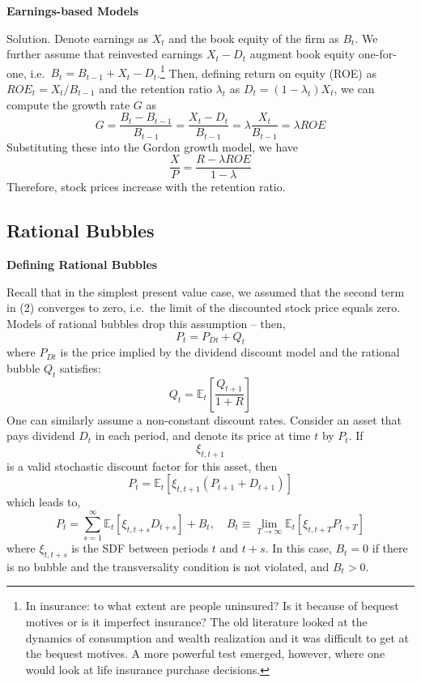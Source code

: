 \documentclass[
]{book}
\begin{document}
\textbf{Earnings-based Models}

Solution. Denote earnings as \(X_{t}\) and the book equity of the firm as \(B_{t}\). We further assume that reinvested earnings \(X_{t}-D_{t}\) augment book equity one-for-one, i.e.~\(B_{t}=B_{t-1}+X_{t}-D_{t}\).\footnote{In insurance: to what extent are people uninsured? Is it because of bequest motives or is it imperfect insurance? The old literature looked at the dynamics of consumption and wealth realization and it was difficult to get at the bequest motives. A more powerful test emerged, however, where one would look at life insurance purchase decisions.} Then, defining return on equity (ROE) as \(ROE_{t}=X_{t}/B_{t-1}\) and the retention ratio \(\lambda_t\) as \(D_{t}=\left(1-\lambda_{t}\right)X_{t}\), we can compute the growth rate \(G\) as
\[
G=\frac{B_{t}-B_{t-1}}{B_{t-1}}=\frac{X_{t}-D_{t}}{B_{t-1}}=\lambda\frac{X_{t}}{B_{t-1}}=\lambda ROE
\]
Substituting these into the Gordon growth model, we have
\[
\frac{X}{P}=\frac{R-\lambda ROE}{1-\lambda}
\]
Therefore, stock prices increase with the retention ratio.

\hypertarget{rational-bubbles}{%
\subsection{\texorpdfstring{\textbf{Rational Bubbles}}{Rational Bubbles}}\label{rational-bubbles}}

\textbf{Defining Rational Bubbles}

Recall that in the simplest present value case, we assumed that the second term in (2) converges to zero, i.e.~the limit of the discounted stock price equals zero. Models of rational bubbles drop this assumption -- then, \[P_t = P_{Dt} + Q_t\] where \(P_{Dt}\) is the price implied by the dividend discount model and the rational bubble \(Q_{t}\) satisfies:
\[
Q_{t}=\mathbb{E}_{t}\left[\frac{Q_{t+1}}{1+R}\right]
\]
One can similarly assume a non-constant discount rates. Consider an asset that pays dividend \(D_t\) in each period, and denote its price at time \(t\) by \(P_t\). If \[\xi_{t,t+1}\] is a valid stochastic discount factor for this asset, then
\[
P_t = \mathbb{E}_t[\xi_{t,t+1}(P_{t+1} + D_{t+1})]
\]
which leads to,
\[
P_t = \sum_{s=1}^\infty \mathbb{E}_t[\xi_{t,t+s}D_{t+s}]+B_t,\quad B_t \equiv \lim_{T\to\infty} \mathbb{E}_t[\xi_{t,t+T}P_{t+T}]
\]
where \(\xi_{t,t+s}\) is the SDF between periods \(t\) and \(t+s\). In this case, \(B_t=0\) if there is no bubble and the transversality condition is not violated, and \(B_t > 0\).
\end{document}
